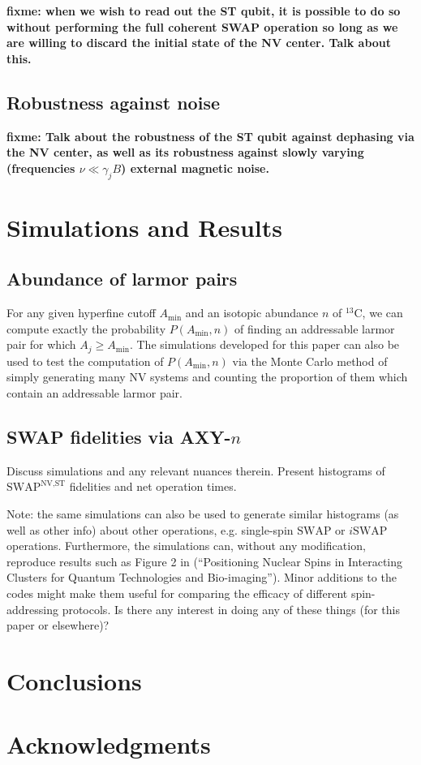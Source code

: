 \documentclass[twocolumn]{revtex4-1}
\renewcommand{\t}{\text} %
\newcommand{\p}[1]{\left(#1\right)} %
\newcommand{\SWAP}{\t{SWAP}}
\newcommand{\NV}{\t{NV}}
\newcommand{\ST}{\t{ST}}
\newcommand{\fixme}[1]{{\bf \color{red} fixme: #1}}
\begin{document}
\fixme{when we wish to read out the ST qubit, it is possible to do so
  without performing the full coherent SWAP operation so long as we
  are willing to discard the initial state of the NV center. Talk
  about this.}

\subsection{Robustness against noise}

\fixme{Talk about the robustness of the ST qubit against dephasing via
  the NV center, as well as its robustness against slowly varying
  (frequencies $\nu\ll\gamma_jB$) external magnetic noise.}

\section{Simulations and Results}

\subsection{Abundance of larmor pairs}

For any given hyperfine cutoff $A_{\t{min}}$ and an isotopic abundance
$n$ of $^{13}$C, we can compute exactly the probability
$P\p{A_{\t{min}},n}$ of finding an addressable larmor pair for which
$A_j\ge A_{\t{min}}$. The simulations developed for this paper can
also be used to test the computation of $P\p{A_{\t{min}},n}$ via the
Monte Carlo method of simply generating many NV systems and counting
the proportion of them which contain an addressable larmor pair.

\subsection{SWAP fidelities via AXY-$n$}

Discuss simulations and any relevant nuances therein. Present
histograms of $\SWAP^{\NV,\ST}$ fidelities and net operation times.

Note: the same simulations can also be used to generate similar
histograms (as well as other info) about other operations,
e.g. single-spin $\SWAP$ or $i\SWAP$ operations. Furthermore, the
simulations can, without any modification, reproduce results such as
Figure 2 in \cite{wang2016positioning} (``Positioning Nuclear Spins in
Interacting Clusters for Quantum Technologies and
Bio-imaging''). Minor additions to the codes might make them useful
for comparing the efficacy of different spin-addressing protocols. Is
there any interest in doing any of these things (for this paper or
elsewhere)?

\section{Conclusions}

\section{Acknowledgments}


\end{document}

